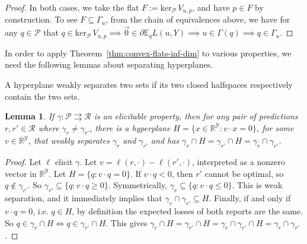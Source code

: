 \documentclass{article} %
\newcommand{\Comments}{0}
\newcommand{\mytodo}[2]{\ifnum\Comments=1%
	\todo[linecolor=#1!80!black,backgroundcolor=#1,bordercolor=#1!80!black]{#2}\fi}
\newcommand{\btw}[1]{}%
\newcommand{\reals}{\mathbb{R}}
\newcommand{\zeros}[1]{\mathrm{ker}_\P\,#1}
\newcommand{\E}{\mathbb{E}}
\newcommand{\R}{\mathcal{R}}
\renewcommand{\P}{\mathcal{P}}
\newcommand{\Y}{\mathcal{Y}}
\newcommand{\toto}{\rightrightarrows}
\newtheorem{lemma}{Lemma}
\begin{document}
\begin{proof}
	In both cases, we take the flat $F := \zeros{V_{u,p}}$, and have $p \in F$ by construction.
	To see $F \subseteq \Gamma_u$, from the chain of equivalences above, we have for any $q\in\P$ that $q \in \zeros{V_{u,p}} \implies \vec 0 \in \partial \E_q L(u,Y) \implies u \in \Gamma(q) \implies q \in \Gamma_u$.
\end{proof}

In order to apply Theorem~\ref{thm:convex-flats-inf-dim} to various properties, we need the following lemmas about separating hyperplanes.

A hyperplane weakly separates two sets if its two closed halfspaces respectively contain the two sets.
\begin{lemma}\label{lem:intersect-levelsets}
	If $\gamma: \P \toto \R$ is an elicitable property, then for any pair of predictions $r, r' \in \R$ where $\gamma_r \neq \gamma_{r'}$, there is a hyperplane $H = \{x \in \reals^{\Y} : v \cdot x = 0\}$, for some $v \in \reals^\Y$, that weakly separates $\gamma_r$ and $\gamma_{r'}$ and has $\gamma_r \cap H = \gamma_{r'} \cap H = \gamma_r \cap \gamma_{r'}$.
\end{lemma}
\begin{proof}
	\btw{Bo: the proof holds as written for the case where the level sets have empty intersection.}
	Let $\ell$ elicit $\gamma$.
	Let $v = \ell(r, \cdot) - \ell(r', \cdot)$, interpreted as a nonzero vector in $\reals^\Y$.
	Let $H = \{ q : v \cdot q = 0 \}$.
	If $v \cdot q < 0$, then $r'$ cannot be optimal, so $q \not\in \gamma_{r'}$.
	So $\gamma_{r'} \subseteq \{ q : v \cdot q \geq 0 \}$.
	Symmetrically, $\gamma_r \subseteq \{ q : v \cdot q \leq 0 \}$.
	This is weak separation, and it immediately implies that $\gamma_r \cap \gamma_{r'} \subseteq H$.
	Finally, if and only if $v \cdot q = 0$, i.e. $q \in H$, by definition the expected losses of both reports are the same.
	So $q \in \gamma_r \cap H \iff q \in \gamma_{r'} \cap H$.
	This gives $\gamma_r \cap H = \gamma_{r'} \cap H = \gamma_r \cap \gamma_{r'} \cap H = \gamma_r \cap \gamma_{r'}$.
\end{proof}
\end{document}

